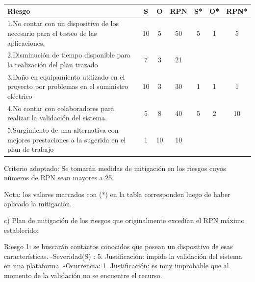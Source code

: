 \documentclass[
11pt, %
]{charter}
\begin{document}
\begin{table}[htpb]
\centering
\begin{tabularx}{\linewidth}{@{}|X|c|c|c|c|c|c|@{}}
\hline
\rowcolor[HTML]{C0C0C0} 
Riesgo & S & O & RPN & S* & O* & RPN* \\ \hline
1.No contar con un dispositivo de los necesario para el testeo de las aplicaciones.    &   10 & 5  &  50  &  5  & 1   & 5   \\ \hline
2.Disminución de tiempo disponible para la realización del plan trazado       & 7  & 3  & 21    &    &    &      \\ \hline
3.Daño en equipamiento utilizado en el proyecto por problemas en el suministro eléctrico       & 10  & 3  & 30    &  1  &   1 &     1 \\ \hline
4.No contar con colaboradores para realizar la validación del sistema.     & 5  & 8 & 40    &  5  &  2  &    10  \\ \hline
5.Surgimiento de una alternativa con mejores prestaciones a la sugerida en el plan de trabajo       & 1  & 10 & 10    &    &    &      \\ \hline
\end{tabularx}%
\end{table}

Criterio adoptado: 
Se tomarán medidas de mitigación en los riesgos cuyos números de RPN sean mayores a 25.

Nota: los valores marcados con (*) en la tabla corresponden luego de haber aplicado la mitigación.

c) Plan de mitigación de los riesgos que originalmente excedían el RPN máximo establecido:

          
Riesgo 1: se buscarán contactos conocidos que posean un dispositivo de esas características.
-Severidad(S) : 5.\newline
	Justificación: impide la validación del sistema en una plataforma.\newline
-Ocurrencia: 1.\newline
	Justificación: es muy improbable que al momento de la validación no se encuentre el recurso.
\end{document}
